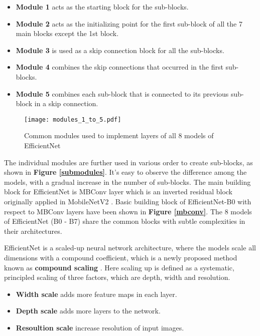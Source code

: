 \documentclass[conference]{IEEEtran}
\begin{document}
\begin{itemize}
    \item \textbf{Module 1} acts as the starting block for the sub-blocks.
    \item \textbf{Module 2} acts as the initializing point for the first sub-block of all the 7 main blocks except the 1st block.
    \item \textbf{Module 3} is used as a skip connection block for all the sub-blocks.
    \item \textbf{Module 4} combines the skip connections that occurred in the first sub-blocks.
    \item \textbf{Module 5} combines each sub-block that is connected to its previous sub-block in a skip connection.
\end{itemize}


\begin{figure}[h!]
    \centering
    \texttt{[image: modules\_1\_to\_5.pdf]}
    \caption{Common modules used to implement layers of all 8 models of EfficientNet}
    \label{Common_blocks}
\end{figure}


The individual modules are further used in various order to create sub-blocks, as shown in \textbf{Figure \ref{submodules}}. It’s easy to observe the difference among the models, with a gradual increase in the number of sub-blocks. The main building block for EfficientNet is MBConv layer which is an inverted residual block originally applied in MobileNetV2 \cite{sandler2018mobilenetv2}. Basic building block of EfficientNet-B0 with respect to MBConv layers have been shown in \textbf{Figure \ref{mbconv}}. The 8 models of EfficientNet (B0 - B7) share the common blocks with subtle complexities in their architectures. 






EfficientNet is a scaled-up neural network architecture, where the models scale all dimensions with a compound coefficient, which is a newly proposed method known as \textbf{compound scaling} \cite{lee2020compounding}. Here scaling up is defined as a systematic, principled scaling of three factors, which are depth, width and resolution.

\begin{samepage}
\begin{itemize}
    \item \textbf{Width scale} adds more feature maps in each layer.
    \item \textbf{Depth scale} adds more layers to the network.
    \item \textbf{Resoultion scale} increase resolution of input images.
\end{itemize}
\end{samepage}
\end{document}
